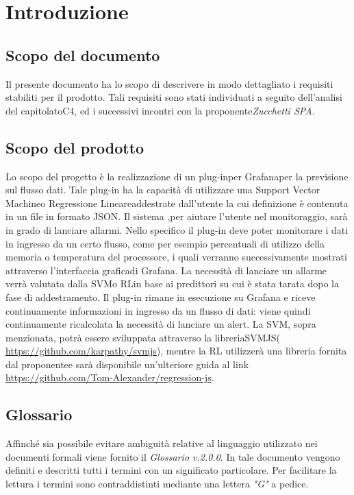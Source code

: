 \section{Introduzione}
	\subsection{Scopo del documento}
		Il presente documento ha lo scopo di descrivere in modo dettagliato i requisiti stabiliti per il prodotto. Tali requisiti sono stati individuati a seguito dell'analisi del capitolato\glo C4, ed i successivi incontri con la proponente\glo \emph{Zucchetti SPA.}

	
\subsection{Scopo del prodotto}
   Lo scopo del progetto è la realizzazione di un plug-in\glo per Grafana\glo per la previsione sul flusso dati\glo. Tale plug-in ha la capacità di utilizzare una Support Vector Machine\glo o Regressione Lineare\glo addestrate dall'utente la cui definizione è contenuta in un file in formato JSON\glo. Il sistema ,per aiutare l’utente nel monitoraggio, sarà in grado di lanciare allarmi.
Nello specifico il plug-in deve poter monitorare i dati in ingresso da un certo flusso, come per esempio percentuali di utilizzo della memoria o temperatura del processore, i quali verranno successivamente mostrati attraverso l'interfaccia grafica\glo di Grafana.
La necessità di lanciare un allarme verrà valutata dalla SVM\glo o RL\glo in base ai predittori su cui è stata tarata dopo la fase di addestramento.
Il plug-in rimane in esecuzione su Grafana e riceve continuamente informazioni in ingresso da un flusso di dati: viene quindi continuamente ricalcolata la necessità di lanciare un alert\glo.
La SVM, sopra menzionata, potrà essere sviluppata attraverso la libreria\glo SVMJS\glo (\url{ https://github.com/karpathy/svmjs}), mentre la RL utilizzerà una libreria fornita dal proponente\glo e sarà disponibile un’ulteriore guida al link \url{https://github.com/Tom-Alexander/regression-js}.

	
	\subsection{Glossario}
		Affinché sia possibile evitare ambiguità relative al linguaggio utilizzato nei documenti formali viene fornito il \emph{Glossario v.2.0.0}. In tale documento vengono definiti e descritti tutti i termini con un significato particolare. Per facilitare la lettura i termini sono contraddistinti mediante una lettera \emph{"G"} a pedice.
		
